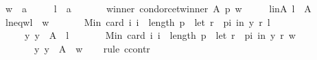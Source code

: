 \begin{isabellebody}
\ \ \ \ w\ {\isacharcolon}{\kern0pt}{\isacharcolon}{\kern0pt}\ {\isachardoublequoteopen}{\isacharprime}{\kern0pt}a{\isachardoublequoteclose}\ \isanewline
\ \ \ \ l\ {\isacharcolon}{\kern0pt}{\isacharcolon}{\kern0pt}\ {\isachardoublequoteopen}{\isacharprime}{\kern0pt}a{\isachardoublequoteclose}\isanewline
\ \ \isamarkupfalse%
\isanewline
\ \ \ \ winner{\isacharcolon}{\kern0pt}\ {\isachardoublequoteopen}condorcet{\isacharunderscore}{\kern0pt}winner\ A\ p\ w{\isachardoublequoteclose}\ \isanewline
\ \ \ \ l{\isacharunderscore}{\kern0pt}in{\isacharunderscore}{\kern0pt}A{\isacharcolon}{\kern0pt}\ {\isachardoublequoteopen}l\ {\isasymin}\ A{\isachardoublequoteclose}\ \isanewline
\ \ \ \ l{\isacharunderscore}{\kern0pt}neq{\isacharunderscore}{\kern0pt}w{\isacharcolon}{\kern0pt}{\isachardoublequoteopen}l\ {\isasymnoteq}\ w{\isachardoublequoteclose}\isanewline
\ \ \isamarkupfalse%
\isanewline
\ \ \ \ {\isachardoublequoteopen}Min\ {\isacharbraceleft}{\kern0pt}card\ {\isacharbraceleft}{\kern0pt}i{\isachardot}{\kern0pt}\ i\ {\isacharless}{\kern0pt}\ length\ p\ {\isasymand}\ {\isacharparenleft}{\kern0pt}let\ r\ {\isacharequal}{\kern0pt}\ {\isacharparenleft}{\kern0pt}p{\isacharbang}{\kern0pt}i{\isacharparenright}{\kern0pt}\ in\ {\isacharparenleft}{\kern0pt}y\ {\isasympreceq}\isactrlsub r\ l{\isacharparenright}{\kern0pt}{\isacharparenright}{\kern0pt}{\isacharbraceright}{\kern0pt}\ {\isacharbar}{\kern0pt}\isanewline
\ \ \ \ \ \ \ \ y{\isachardot}{\kern0pt}\ y\ {\isasymin}\ A\ {\isacharminus}{\kern0pt}\ {\isacharbraceleft}{\kern0pt}l{\isacharbraceright}{\kern0pt}{\isacharbraceright}{\kern0pt}\ {\isacharless}{\kern0pt}\isanewline
\ \ \ \ \ \ Min\ {\isacharbraceleft}{\kern0pt}card\ {\isacharbraceleft}{\kern0pt}i{\isachardot}{\kern0pt}\ i\ {\isacharless}{\kern0pt}\ length\ p\ {\isasymand}\ {\isacharparenleft}{\kern0pt}let\ r\ {\isacharequal}{\kern0pt}\ {\isacharparenleft}{\kern0pt}p{\isacharbang}{\kern0pt}i{\isacharparenright}{\kern0pt}\ in\ {\isacharparenleft}{\kern0pt}y\ {\isasympreceq}\isactrlsub r\ w{\isacharparenright}{\kern0pt}{\isacharparenright}{\kern0pt}{\isacharbraceright}{\kern0pt}\ {\isacharbar}{\kern0pt}\isanewline
\ \ \ \ \ \ \ \ \ \ y{\isachardot}{\kern0pt}\ y\ {\isasymin}\ A\ {\isacharminus}{\kern0pt}\ {\isacharbraceleft}{\kern0pt}w{\isacharbraceright}{\kern0pt}{\isacharbraceright}{\kern0pt}{\isachardoublequoteclose}\isanewline
\ \ \isamarkupfalse%
\ {\isacharparenleft}{\kern0pt}rule\ ccontr{\isacharparenright}{\kern0pt}\isanewline
\ \ \ \ \isamarkupfalse%

\end{isabellebody}
